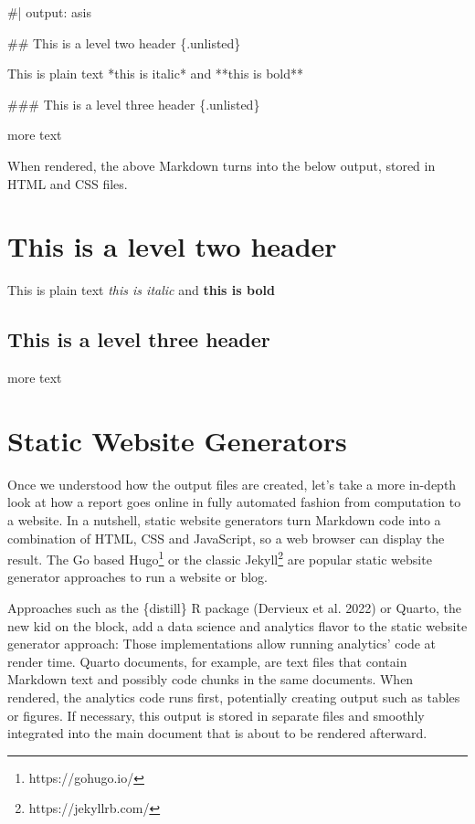 \documentclass[
  12pt,
  letterpaper,
]{krantz}
\newenvironment{Shaded}{\begin{snugshade}}{\end{snugshade}}
\newcommand{\FunctionTok}[1]{\textcolor[rgb]{0.28,0.35,0.67}{#1}}
\newcommand{\NormalTok}[1]{\textcolor[rgb]{0.00,0.23,0.31}{#1}}
\begin{document}
\begin{Shaded}
\begin{Highlighting}[]
\NormalTok{\#| output: asis}


\FunctionTok{\#\# This is a level two header \{.unlisted\}}

\NormalTok{This is plain text *this is italic*}
\NormalTok{and **this is bold**}

\FunctionTok{\#\#\# This is a level three header \{.unlisted\}}

\NormalTok{more text}
\end{Highlighting}
\end{Shaded}

When rendered, the above Markdown turns into the below output, stored in
HTML and CSS files.

\hypertarget{this-is-a-level-two-header}{%
\section{This is a level two header}\label{this-is-a-level-two-header}}

This is plain text \emph{this is italic} and \textbf{this is bold}

\hypertarget{this-is-a-level-three-header}{%
\subsection{This is a level three
header}\label{this-is-a-level-three-header}}

more text

\hypertarget{static-website-generators}{%
\section{\texorpdfstring{Static Website
Generators}{Static Website Generators}}\label{static-website-generators}}

Once we understood how the output files are created, let's take a more
in-depth look at how a report goes online in fully automated fashion
from computation to a website. In a nutshell, static website generators
turn Markdown code into a combination of HTML, CSS and
JavaScript, so a web browser can display the result. The Go
based Hugo\footnote{https://gohugo.io/} or the
classic Jekyll\footnote{https://jekyllrb.com/} are popular
static website generator approaches to run a website or blog.

Approaches such as the \{distill\} R package (Dervieux et al. 2022) or
Quarto, the new kid on the block, add a data science and
analytics flavor to the static website generator approach: Those
implementations allow running analytics' code at render time.
Quarto documents, for example, are text files that contain
Markdown text and possibly code chunks in the same documents. When
rendered, the analytics code runs first, potentially creating output
such as tables or figures. If necessary, this output is stored in
separate files and smoothly integrated into the main document that is
about to be rendered afterward.
\end{document}
